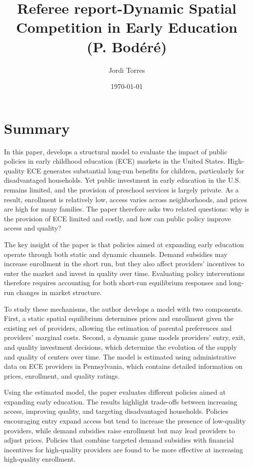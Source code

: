 \documentclass{article}
\begin{document}
\title{Referee report-Dynamic Spatial Competition in Early Education (P. Bodéré)}
\author{Jordi Torres}
\date{\today}

\maketitle

\section{Summary}
In this paper, \citet{bodere2023dynamic} develops a structural model to evaluate the impact of public policies in early childhood education (ECE) markets in the United States. High-quality ECE generates substantial long-run benefits for children, particularly for disadvantaged households. Yet public investment in early education in the U.S. remains limited, and the provision of preschool services is largely private. As a result, enrollment is relatively low, access varies across neighborhoods, and prices are high for many families. The paper therefore asks two related questions: why is the provision of ECE limited and costly, and how can public policy improve access and quality?

The key insight of the paper is that policies aimed at expanding early education operate through both static and dynamic channels. Demand subsidies may increase enrollment in the short run, but they also affect providers’ incentives to enter the market and invest in quality over time. Evaluating policy interventions therefore requires accounting for both short-run equilibrium responses and long-run changes in market structure.

To study these mechanisms, the author develops a model with two components. First, a static spatial equilibrium determines prices and enrollment given the existing set of providers, allowing the estimation of parental preferences and providers’ marginal costs. Second, a dynamic game models providers’ entry, exit, and quality investment decisions, which determine the evolution of the supply and quality of centers over time. The model is estimated using administrative data on ECE providers in Pennsylvania, which contains detailed information on prices, enrollment, and quality ratings.

Using the estimated model, the paper evaluates different policies aimed at expanding early education. The results highlight trade-offs between increasing access, improving quality, and targeting disadvantaged households. Policies encouraging entry expand access but tend to increase the presence of low-quality providers, while demand subsidies raise enrollment but may lead providers to adjust prices. Policies that combine targeted demand subsidies with financial incentives for high-quality providers are found to be more effective at increasing high-quality enrollment.
\end{document}
